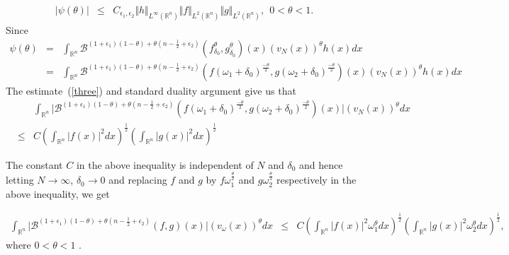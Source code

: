 \documentclass[a4paper,12pt]{amsart}
\newcommand{\R}{{\mathbb {R}}}
\begin{document}
\begin{eqnarray}\label{three}
\vert\psi(\theta)\vert
&\leq & C_{\epsilon_{1},\epsilon_{2}}\Vert h\Vert_{L^{\infty}(\mathbb{R}^{n})}\Vert f\Vert_{L^{2}(\mathbb{R}^{n})}\Vert g\Vert_{L^{2}(\mathbb{R}^{n})},~~0<\theta<1.
\end{eqnarray} 
Since
\begin{eqnarray*}
\psi(\theta)
&=&\int_{\mathbb{R}^{n}}\mathcal {B}^{(1+\epsilon_{1})(1-\theta)+\theta(n-\frac{1}{2}+\epsilon_{2})}(f^{\theta}_{\delta_{0}},g^{\theta}_{\delta_{0}})(x)(v_{N}(x))^{\theta}h(x)dx \\
&=&\int_{\R^n} \mathcal {B}^{(1+\epsilon_{1})(1-\theta)+\theta(n-\frac{1}{2}+\epsilon_{2})}\left(f(\omega_{1}+\delta_{0})^{\frac{-\theta}{2}}, g(\omega_{2}+\delta_{0})^{\frac{-\theta}{2}} \right)(x)(v_{N}(x))^{\theta}h(x)dx
\end{eqnarray*}
The estimate~(\ref{three}) and standard duality argument give us that  
\begin{eqnarray*}
& & \int_{\R^n}  \vert\mathcal {B}^{(1+\epsilon_{1})(1-\theta)+\theta(n-\frac{1}{2}+\epsilon_{2})}\left(f(\omega_{1}+\delta_{0})^{\frac{-\theta}{2}}, g(\omega_{2}+\delta_{0})^{\frac{-\theta}{2}} \right)(x)\vert(v_{N}(x))^{\theta}dx\\
&\leq & C \left(\int_{\R^n} \vert f(x)\vert^{2} dx\right)^{\frac{1}{2}}\left(\int_{\R^n} \vert g(x)\vert^{2} dx\right)^{\frac{1}{2}}
\end{eqnarray*}
  
The constant $C$ in the above inequality is independent of $N$ and $\delta_{0}$ and hence letting $N\rightarrow \infty$, $\delta_{0}\rightarrow0$ and replacing $f$ and $g$ by  $f\omega_{1}^{\frac{\theta}{2}}$ and $g\omega_{2}^{\frac{\theta}{2}}$ respectively in the above inequality, we get 

\begin{align} \label{esti:wei}
\int_{\R^n} \vert\mathcal {B}^{(1+\epsilon_{1})(1-\theta)+\theta(n-\frac{1}{2}+\epsilon_{2})}\left(f, g \right)(x)\vert(v_{\omega}(x))^{\theta}dx
&\leq & C \left(\int_{\R^n} \vert f(x)\vert^{2}\omega_{1}^{\theta} dx\right)^{\frac{1}{2}}\left(\int_{\R^n} \vert g(x)\vert^{2}\omega_{2}^{\theta} dx\right)^{\frac{1}{2}},
\end{align}
where $0<\theta<1$ . 
\end{document}
